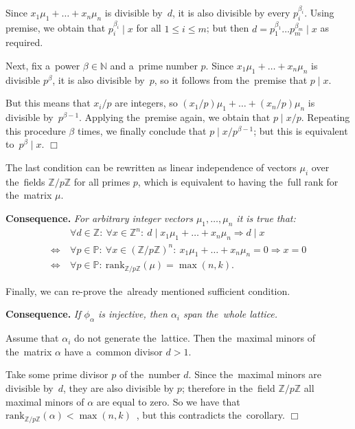 \documentclass[twoside]{article}
\begin{document}
    Since $x_1 \mu_1 + \ldots + x_n \mu_n$ is divisible by~$d$, it is also divisible by every $p_i^{\beta_i}$.
    Using premise, we obtain that $p_i^{\beta_i} \mid x$ for all $1 \leq i \leq m$; but then
    $d = p_1^{\beta_1} \ldots p_m^{\beta_m} \mid x$ as required.

    Next, fix a~power $\beta \in \mathbb{N}$ and a~prime number $p$.
    Since $x_1 \mu_1 + \ldots + x_n \mu_n$ is divisible $p^\beta$,
    it is also divisible by~$p$, so it follows from the~premise that $p \mid x$.

    But this means that $x_i / p$ are integers, so $(x_1 / p) \mu_1 + \ldots + (x_n / p) \mu_n$ is divisible by~$p^{\beta - 1}$.
    Applying the~premise again, we obtain that $p \mid x / p$. Repeating this procedure $\beta$ times, we finally conclude
    that $p \mid x / p^{\beta - 1}$; but this is equivalent to~$p^\beta \mid x$.
\hfill$\Box$\medskip

The last condition can be rewritten as linear independence of vectors $\mu_i$ over the~fields $\mathbb{Z} / p\mathbb{Z}$
for all primes $p$, which is equivalent to having the~full rank for the~matrix $\mu$.

\medskip\noindent\textbf{Consequence.}\emph{
    For arbitrary integer vectors $\mu_1, \ldots, \mu_n$ it is true that:
    \begin{align*}
                         & \forall d \in \mathbb{Z}{:}\ \forall x \in \mathbb{Z}^n{:}\ d \mid x_1 \mu_1 + \ldots + x_n \mu_n \Rightarrow d \mid x \\
        \Leftrightarrow\ & \forall p \in \mathbb{P}{:}\ \forall x \in (\mathbb{Z} / p\mathbb{Z})^n{:}\ x_1 \mu_1 + \ldots + x_n \mu_n = 0 \Rightarrow x = 0 \\
        \Leftrightarrow\ & \forall p \in \mathbb{P}{:}\ \mathrm{rank}_{\mathbb{Z} / p \mathbb{Z}}(\mu) = \max(n, k).
    \end{align*}
}

Finally, we can re-prove the~already mentioned sufficient condition.

\medskip\noindent\textbf{Consequence.}\emph{
    If $\phi_\alpha$ is injective, then $\alpha_i$ span the~whole lattice.
}\medskip

    Assume that $\alpha_i$ do not generate the~lattice. Then the~maximal minors of the~matrix $\alpha$ have a~common divisor $d > 1$.

    Take some prime divisor $p$ of the~number $d$. Since the~maximal minors are divisible by~$d$, they are also divisible by $p$;
    therefore in the~field $\mathbb{Z} / p \mathbb{Z}$ all maximal minors of $\alpha$ are equal to zero.
    So we have that $\mathrm{rank}_{\mathbb{Z} / p \mathbb{Z}}(\alpha) < \max(n, k)$~\cite{Brbk70},
    but this contradicts the~corollary.
\hfill$\Box$
\end{document}
